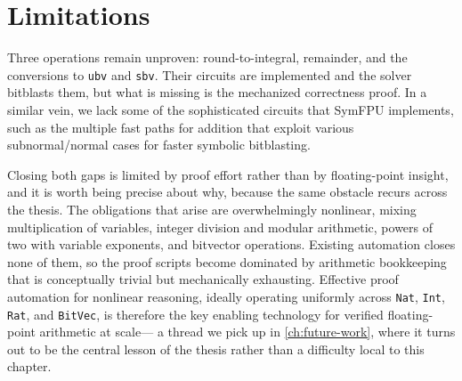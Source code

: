 \section{Limitations}
\label{sec:fp:limitations}

Three operations remain unproven:
round-to-integral, remainder, and the conversions to \texttt{ubv} and \texttt{sbv}.
Their circuits are implemented and the solver bitblasts them,
but what is missing is the mechanized correctness proof.
In a similar vein, we lack some of the sophisticated circuits that SymFPU implements,
such as the multiple fast paths for addition that exploit various subnormal/normal cases for faster symbolic bitblasting.

Closing both gaps is limited by proof effort rather than by floating-point insight,
and it is worth being precise about why, because the same obstacle recurs across the thesis.
The obligations that arise are overwhelmingly nonlinear, mixing multiplication of variables, integer division and modular arithmetic, powers of two with variable exponents, and bitvector operations.
Existing automation closes none of them, so the proof scripts become dominated by arithmetic bookkeeping that is conceptually trivial but mechanically exhausting.
Effective proof automation for nonlinear reasoning, ideally operating uniformly across \texttt{Nat}, \texttt{Int}, \texttt{Rat}, and \texttt{BitVec}, is therefore the key enabling technology for verified floating-point arithmetic at scale---%
a thread we pick up in \cref{ch:future-work}, where it turns out to be the central lesson of the thesis rather than a difficulty local to this chapter.
